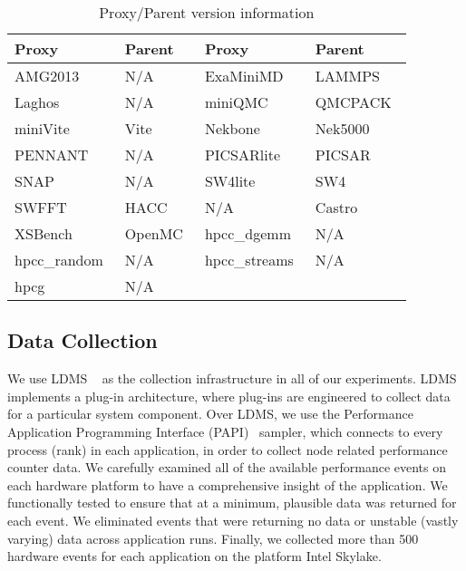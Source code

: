 \begin{table}[!t]
\caption{Proxy/Parent version information}
\label{tab:version}
\centering
\begin{tabular}{ll|ll}
\toprule
\textbf{Proxy} & \textbf{Parent} & \textbf{Proxy} & \textbf{Parent}  \\ 
\midrule
AMG2013~\cite{AMG}      &  \cellcolor{Gray!50}N/A        & ExaMiniMD~\cite{ostiExaMiniMD}      &  \cellcolor{Gray!50}LAMMPS~\cite{LAMMPS}    \\
Laghos~\cite{Laghos}         & \cellcolor{Gray!50}N/A        & miniQMC~\cite{richards2018fy18}         & \cellcolor{Gray!50}QMCPACK~\cite{qmcpack}   \\
miniVite~\cite{miniVite}       & \cellcolor{Gray!50}Vite~\cite{Vite}       &  Nekbone        & \cellcolor{Gray!50}Nek5000~\cite{Nek5000}     \\
PENNANT         & \cellcolor{Gray!50}N/A      & PICSARlite      &\cellcolor{Gray!50}PICSAR~\cite{PICSAR}       \\
SNAP~\cite{snap}            & \cellcolor{Gray!50}N/A       & SW4lite ~\cite{ECPProxySuite1}        & \cellcolor{Gray!50}SW4~\cite{SW42}       \\
SWFFT~\cite{ECPProxySuite1}          & \cellcolor{Gray!50}HACC~\cite{HACC}      & N/A            &\cellcolor{Gray!50}Castro~\cite{Castro}      \\
XSBench~\cite{XSBench}        & \cellcolor{Gray!50}OpenMC~\cite{OpenMC}    & hpcc\_dgemm~\cite{hpcc}   & \cellcolor{Gray!50}N/A        \\
hpcc\_random~\cite{hpcc}    & \cellcolor{Gray!50}N/A        & hpcc\_streams~\cite{hpcc}   &\cellcolor{Gray!50}N/A       \\
hpcg ~\cite{hpcg}          & \cellcolor{Gray!50}N/A           \\ 
\bottomrule
\end{tabular}
\end{table}
\subsection{Data Collection}
\label{sec:collect}
We use LDMS ~\cite{ldms_sandia} as the collection infrastructure in all of our experiments. LDMS implements a plug-in architecture, where plug-ins are  engineered to collect data for a particular system component. Over LDMS, we use the Performance Application Programming Interface (PAPI)~\cite{terpstra2010collecting} sampler, which %
connects to every process (rank) in each application, in order to collect node related performance counter data. We carefully examined all of the available performance events on each hardware platform to have a comprehensive insight of the application. We functionally tested to ensure that at a minimum, plausible data was returned for each event. We eliminated events that were returning no data or unstable (\ie vastly varying) data across application runs. Finally, we collected more than 500 hardware events for each application on the platform Intel Skylake. 

